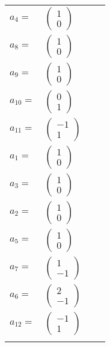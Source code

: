 \documentclass[1p]{elsarticle_modified}
\theoremstyle{definition}
\begin{document}
\begin{tabular}{m{7pt} m{180pt} m{7pt} m{180pt} }
\flushright $a_{4}=$&$\begin{pmatrix}1\\0\end{pmatrix}$ \\
\flushright $a_{8}=$&$\begin{pmatrix}1\\0\end{pmatrix}$ \\
\flushright $a_{9}=$&$\begin{pmatrix}1\\0\end{pmatrix}$ \\
\flushright $a_{10}=$&$\begin{pmatrix}0\\1\end{pmatrix}$ \\
\flushright $a_{11}=$&$\begin{pmatrix}-1\\1\end{pmatrix}$ \\
\flushright $a_{1}=$&$\begin{pmatrix}1\\0\end{pmatrix}$ \\
\flushright $a_{3}=$&$\begin{pmatrix}1\\0\end{pmatrix}$ \\
\flushright $a_{2}=$&$\begin{pmatrix}1\\0\end{pmatrix}$ \\
\flushright $a_{5}=$&$\begin{pmatrix}1\\0\end{pmatrix}$ \\
\flushright $a_{7}=$&$\begin{pmatrix}1\\-1\end{pmatrix}$ \\
\flushright $a_{6}=$&$\begin{pmatrix}2\\-1\end{pmatrix}$ \\
\flushright $a_{12}=$&$\begin{pmatrix}-1\\1\end{pmatrix}$\\&\end{tabular}
\end{document}
